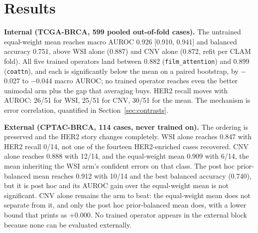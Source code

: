 \documentclass[10pt,a4paper]{article}
\begin{document}
\section{Results}



\textbf{Internal (TCGA-BRCA, 599 pooled out-of-fold cases).} The untrained equal-weight mean
reaches macro AUROC 0.926 [0.910, 0.941] and balanced accuracy 0.751, above WSI alone (0.887) and
CNV alone (0.872, refit per CLAM fold). All five trained operators land between 0.882
(\texttt{film\_attention}) and 0.899 (\texttt{coattn}), and each is significantly below the mean
on a paired bootstrap, by $-$0.027 to $-$0.044 macro AUROC; no trained operator reaches even the
better unimodal arm plus the gap that averaging buys. HER2 recall moves with AUROC: 26/51 for WSI,
25/51 for CNV, 30/51 for the mean. The mechanism is error correlation, quantified in
Section~\ref{sec:contrasts}.

\textbf{External (CPTAC-BRCA, 114 cases, never trained on).} The ordering is preserved and the
HER2 story changes completely. WSI alone reaches 0.847 with HER2 recall 0/14, not one of the
fourteen HER2-enriched cases recovered. CNV alone reaches 0.888 with 12/14, and the equal-weight
mean 0.909 with 6/14, the mean inheriting the WSI arm's confident errors on that class. The post
hoc prior-balanced mean reaches 0.912 with 10/14 and the best balanced accuracy (0.740), but it is
post hoc and its AUROC gain over the equal-weight mean is not significant. CNV alone remains the
arm to beat: the equal-weight mean does not separate from it, and only the post hoc
prior-balanced mean does, with a lower bound that prints as $+0.000$. No trained operator appears
in the external block because none can be evaluated externally.
\end{document}
